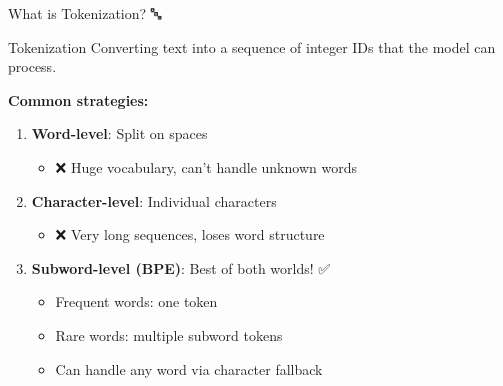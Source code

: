 \documentclass[aspectratio=169]{beamer}
\begin{document}
\begin{frame}[shrink=10]{What is Tokenization? 🔤}
\small
    \begin{block}{Tokenization}
        Converting text into a sequence of integer IDs that the model can process.
    \end{block}

    \vspace{0.3cm}

    \textbf{Common strategies:}
    \begin{enumerate}\setlength{\itemsep}{0pt}
        \item \textbf{Word-level}: Split on spaces
        \begin{itemize}\setlength{\itemsep}{0pt}
            \item ❌ Huge vocabulary, can't handle unknown words
        \end{itemize}

        \item \textbf{Character-level}: Individual characters
        \begin{itemize}\setlength{\itemsep}{0pt}
            \item ❌ Very long sequences, loses word structure
        \end{itemize}

        \item \textbf{Subword-level (BPE)}: Best of both worlds! ✅
        \begin{itemize}\setlength{\itemsep}{0pt}
            \item Frequent words: one token
            \item Rare words: multiple subword tokens
            \item Can handle any word via character fallback
        \end{itemize}
    \end{enumerate}
\end{frame}
\end{document}
